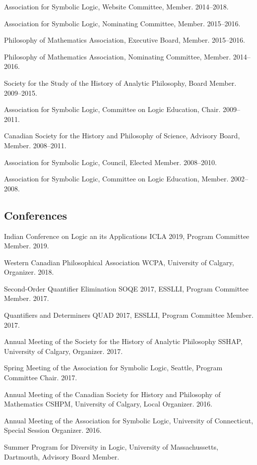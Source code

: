 \documentclass[11pt]{article}
\begin{document}
\ind Association for Symbolic Logic, Website Committee, Member. 2014--2018.

\ind Association for Symbolic Logic, Nominating Committee, Member. 2015--2016.

\ind Philosophy of Mathematics Association, Executive Board, Member. 2015--2016.

\ind Philosophy of Mathematics Association, Nominating Committee, Member. 2014--2016.

\ind Society for the Study of the History of Analytic Philosophy, Board
Member. 2009--2015.

\ind Association for Symbolic Logic, Committee on Logic Education, Chair. 2009--2011.

\ind Canadian Society for the History and Philosophy of Science, Advisory
Board, Member. 2008--2011.

\ind Association for Symbolic Logic, Council, Elected Member. 2008--2010.

\ind Association for Symbolic Logic, Committee on Logic Education, Member. 2002--2008.

\subsection{Conferences}
\ind Indian Conference on Logic an its Applications ICLA 2019, Program
Committee Member. 2019.

\ind Western Canadian Philosophical Association WCPA, University of Calgary,
Organizer. 2018.

\ind Second-Order Quantifier Elimination SOQE 2017, ESSLLI, Program Committee
Member. 2017.

\ind Quantifiers and Determiners QUAD 2017, ESSLLI, Program Committee Member. 2017.

\ind Annual Meeting of the Society for the History of Analytic Philosophy
SSHAP, University of Calgary, Organizer. 2017.

\ind Spring Meeting of the Association for Symbolic Logic, Seattle, Program
Committee Chair. 2017.

\ind Annual Meeting of the Canadian Society for History and Philosophy of
Mathematics CSHPM, University of Calgary, Local Organizer. 2016.

\ind Annual Meeting of the Association for Symbolic Logic, University of
Connecticut, Special Session Organizer. 2016.

\ind Summer Program for Diversity in Logic, University of Massachussetts,
Dartmouth, Advisory Board Member. 
\end{document}

